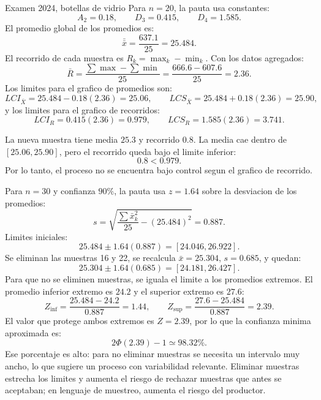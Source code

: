 \begin{pautacompleta}{Examen 2024, botellas de vidrio}
Para $n=20$, la pauta usa constantes:
\[
  A_2=0.18,\qquad D_3=0.415,\qquad D_4=1.585.
\]
El promedio global de los promedios es:
\[
  \bar{\bar x}=\frac{637.1}{25}=25.484.
\]
El recorrido de cada muestra es $R_k=\max_k-\min_k$. Con los datos agregados:
\[
  \bar R=\frac{\sum \max-\sum \min}{25}
  =
  \frac{666.6-607.6}{25}
  =
  2.36.
\]
Los limites para el grafico de promedios son:
\[
  LCI_{\bar X}=25.484-0.18(2.36)=25.06,\qquad
  LCS_{\bar X}=25.484+0.18(2.36)=25.90,
\]
y los limites para el grafico de recorridos:
\[
  LCI_R=0.415(2.36)=0.979,\qquad
  LCS_R=1.585(2.36)=3.741.
\]

La nueva muestra tiene media $25.3$ y recorrido $0.8$. La media cae dentro de $[25.06,25.90]$, pero el recorrido queda bajo el limite inferior:
\[
  0.8<0.979.
\]
Por lo tanto, el proceso no se encuentra bajo control segun el grafico de recorrido.

Para $n=30$ y confianza $90\%$, la pauta usa $z=1.64$ sobre la desviacion de los promedios:
\[
  s=\sqrt{\frac{\sum \bar x_k^2}{25}-(25.484)^2}=0.887.
\]
Limites iniciales:
\[
  25.484\pm 1.64(0.887)=[24.046,26.922].
\]
Se eliminan las muestras 16 y 22, se recalcula $\bar x=25.304$, $s=0.685$, y quedan:
\[
  25.304\pm 1.64(0.685)=[24.181,26.427].
\]
Para que no se eliminen muestras, se iguala el limite a los promedios extremos. El promedio inferior extremo es $24.2$ y el superior extremo es $27.6$:
\[
  Z_{\inf}=\frac{25.484-24.2}{0.887}=1.44,\qquad
  Z_{\sup}=\frac{27.6-25.484}{0.887}=2.39.
\]
El valor que protege ambos extremos es $Z=2.39$, por lo que la confianza minima aproximada es:
\[
  2\Phi(2.39)-1\simeq 98.32\%.
\]
Ese porcentaje es alto: para no eliminar muestras se necesita un intervalo muy ancho, lo que sugiere un proceso con variabilidad relevante. Eliminar muestras estrecha los limites y aumenta el riesgo de rechazar muestras que antes se aceptaban; en lenguaje de muestreo, aumenta el riesgo del productor.
\end{pautacompleta}

